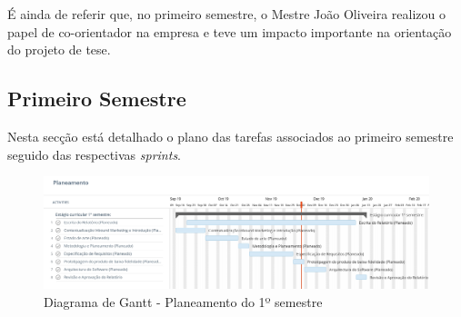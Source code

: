 É ainda de referir que, no primeiro semestre, o Mestre João Oliveira realizou o papel de co-orientador na empresa e teve um impacto importante na orientação do projeto de tese. 

\subsection{Primeiro Semestre}

Nesta secção está detalhado o plano das tarefas associados ao primeiro semestre seguido das respectivas \textit{sprints}.

\begin{figure}[ht!]
	\begin{center}
		\includegraphics[width=1\textwidth]{img/gantt/semestre1.jpeg}
		\caption{Diagrama de Gantt - Planeamento do 1º semestre}
		\label{fig:gantt1}
	\end{center}
\end{figure}

